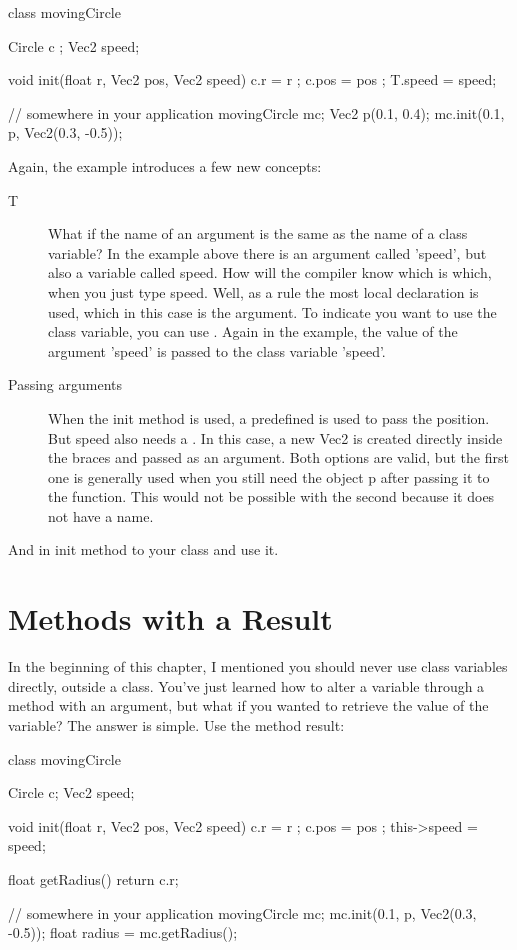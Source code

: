 \begin{code}
class movingCircle {
  Circle c    ;
  Vec2   speed;
  
  void init(float r, Vec2 pos, Vec2 speed) {
    c.r     = r    ;
    c.pos   = pos  ;
    T.speed = speed;
  }
}

// somewhere in your application
movingCircle mc;
Vec2 p(0.1, 0.4);
mc.init(0.1, p, Vec2(0.3, -0.5));
\end{code}

Again, the example introduces a few new concepts:
\begin{description}
\item[T] What if the name of an argument is the same as the name of a class variable? In the example above there is an argument called 'speed', but also a variable called speed. How will the compiler know which is which, when you just type speed. Well, as a rule the most local declaration is used, which in this case is the argument. To indicate you want to use the class variable, you can use . Again in the example, the value of the argument 'speed' is passed to the class variable 'speed'. 
\item[Passing arguments] When the init method is used, a predefined  is used to pass the position. But speed also needs a . In this case, a new Vec2 is created directly inside the braces and passed as an argument. Both options are valid, but the first one is generally used when you still need the object p after passing it to the function. This would not be possible with the second  because it does not have a name.
\end{description}

\begin{exercise}
And in init method to your class and use it.
\end{exercise}

\section{Methods with a Result}
In the beginning of this chapter, I mentioned you should never use class variables directly, outside a class. You've just learned how to alter a variable through a method with an argument, but what if you wanted to retrieve the value of the variable? The answer is simple. Use the method result:


\begin{code}
class movingCircle {
  Circle c;
  Vec2 speed;
  
  void init(float r, Vec2 pos, Vec2 speed) {
    c.r         = r    ;
    c.pos       = pos  ;
    this->speed = speed;
  }
  
  float getRadius() {
    return c.r;
  }
}

// somewhere in your application
movingCircle mc;
mc.init(0.1, p, Vec2(0.3, -0.5));
float radius = mc.getRadius();

\end{code}

